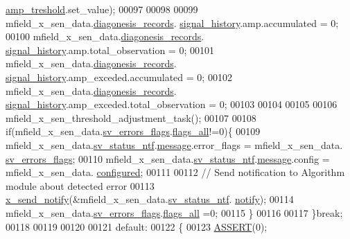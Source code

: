 \begin{DoxyCode}
      \hyperlink{a00021_a4b3bbfb0267daea1432f2603825ade62}{amp\_treshold}.set\_value);
00097 
00098 
00099               mfield\_x\_sen\_data.\hyperlink{a00025_a2bd79ce84bbd6b7f50d38954f7ae475e}{diagonesis\_records}.
      \hyperlink{a00019_ab7038f4de1f77b52a7f89e9f77c0b846}{signal\_history}.amp.accumulated                 = 0;
00100               mfield\_x\_sen\_data.\hyperlink{a00025_a2bd79ce84bbd6b7f50d38954f7ae475e}{diagonesis\_records}.
      \hyperlink{a00019_ab7038f4de1f77b52a7f89e9f77c0b846}{signal\_history}.amp.total\_observation           = 0;
00101               mfield\_x\_sen\_data.\hyperlink{a00025_a2bd79ce84bbd6b7f50d38954f7ae475e}{diagonesis\_records}.
      \hyperlink{a00019_ab7038f4de1f77b52a7f89e9f77c0b846}{signal\_history}.amp\_exceded.accumulated         = 0;
00102               mfield\_x\_sen\_data.\hyperlink{a00025_a2bd79ce84bbd6b7f50d38954f7ae475e}{diagonesis\_records}.
      \hyperlink{a00019_ab7038f4de1f77b52a7f89e9f77c0b846}{signal\_history}.amp\_exceded.total\_observation   = 0;
00103 
00104 
00105 
00106              mfield\_x\_sen\_threshold\_adjustment\_task();
00107 
00108             \textcolor{keywordflow}{if}(mfield\_x\_sen\_data.\hyperlink{a00025_aaeec6b0609dba31393f337abf1cce3d3}{sv\_errors\_flags}.\hyperlink{a00022_a1caa87b00c878186140c3bac9c8acf3b}{flags\_all}!=0)\{
00109              mfield\_x\_sen\_data.\hyperlink{a00025_a752b00333ec308e07c6bd41aa9a01e73}{sv\_status\_ntf}.\hyperlink{a00019_a946af134546e64739ccfd37633480dc2}{message}.error\_flags = mfield\_x\_sen\_data.
      \hyperlink{a00025_aaeec6b0609dba31393f337abf1cce3d3}{sv\_errors\_flags};
00110              mfield\_x\_sen\_data.\hyperlink{a00025_a752b00333ec308e07c6bd41aa9a01e73}{sv\_status\_ntf}.\hyperlink{a00019_a946af134546e64739ccfd37633480dc2}{message}.config = mfield\_x\_sen\_data.
      \hyperlink{a00025_a94b2d1f6ea4ab334c74d24984dd27843}{configured};
00111 
00112              \textcolor{comment}{// Send notification to Algorithm module about detected error}
00113              \hyperlink{a00036_ae17b0bb16da3c471bb6074bb4c4d0fee}{x\_send\_notify}(&mfield\_x\_sen\_data.\hyperlink{a00025_a752b00333ec308e07c6bd41aa9a01e73}{sv\_status\_ntf}.
      \hyperlink{a00019_a8e6a04c2283f9fd7b8dcbc62faba5847}{notify});
00114              mfield\_x\_sen\_data.\hyperlink{a00025_aaeec6b0609dba31393f337abf1cce3d3}{sv\_errors\_flags}.\hyperlink{a00022_a1caa87b00c878186140c3bac9c8acf3b}{flags\_all} =0;
00115             \}
00116 
00117         \}\textcolor{keywordflow}{break};
00118 
00119 
00120 
00121         \textcolor{keywordflow}{default}:
00122         \{
00123             \hyperlink{a00072_abb8ff8e213ac9f6fb21d2b968583b936}{ASSERT}(0);

\end{DoxyCode}
